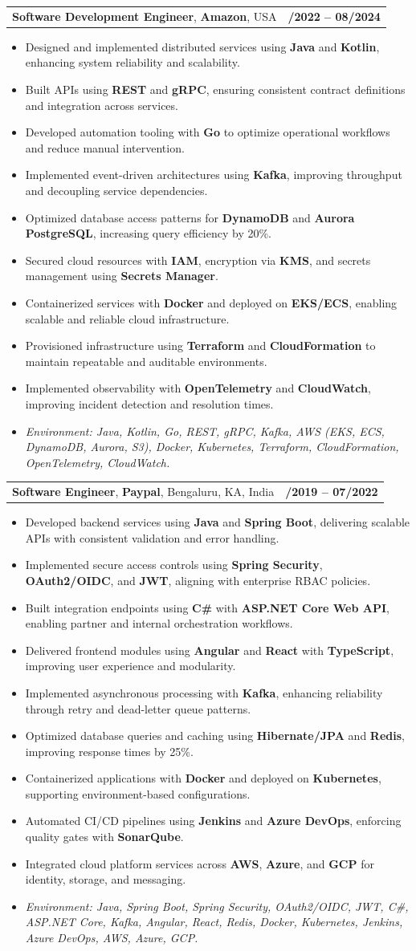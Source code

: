 \documentclass[letterpaper,11pt]{article}
\makeatletter
\newcommand{\resumeItem}[1]{
  \item\footnotesize{
    {#1 \vspace{-2pt}}
  }
}
\newcommand{\resumeSubheading}[4]{
  \vspace{-2pt}\item
    \begin{tabular*}{1.0\textwidth}[t]{l@{\extracolsep{\fill}}r}
      \textbf{\fontsize{10pt}{14pt}\selectfont #3}, \textbf{\fontsize{10pt}{14pt}\selectfont #1}, \fontsize{10pt}{14pt}\selectfont #4 & \textbf{\fontsize{10pt}{14pt}\selectfont #2} \\
    \end{tabular*}\vspace{-7pt}
}
\newcommand{\resumeItemListStart}{\begin{itemize}[leftmargin=*]}
\newcommand{\resumeItemListEnd}{\end{itemize}\vspace{-5pt}}
\makeatother
\begin{document}
\resumeSubheading
{Amazon}{10/2022 -- 08/2024}
{Software Development Engineer}{USA}
\resumeItemListStart
  \resumeItem{Designed and implemented distributed services using \textbf{Java} and \textbf{Kotlin}, enhancing system reliability and scalability.}
  \resumeItem{Built APIs using \textbf{REST} and \textbf{gRPC}, ensuring consistent contract definitions and integration across services.}
  \resumeItem{Developed automation tooling with \textbf{Go} to optimize operational workflows and reduce manual intervention.}
  \resumeItem{Implemented event-driven architectures using \textbf{Kafka}, improving throughput and decoupling service dependencies.}
  \resumeItem{Optimized database access patterns for \textbf{DynamoDB} and \textbf{Aurora PostgreSQL}, increasing query efficiency by 20\%.}
  \resumeItem{Secured cloud resources with \textbf{IAM}, encryption via \textbf{KMS}, and secrets management using \textbf{Secrets Manager}.}
  \resumeItem{Containerized services with \textbf{Docker} and deployed on \textbf{EKS/ECS}, enabling scalable and reliable cloud infrastructure.}
  \resumeItem{Provisioned infrastructure using \textbf{Terraform} and \textbf{CloudFormation} to maintain repeatable and auditable environments.}
  \resumeItem{Implemented observability with \textbf{OpenTelemetry} and \textbf{CloudWatch}, improving incident detection and resolution times.}
  \resumeItem{\textit{Environment: Java, Kotlin, Go, REST, gRPC, Kafka, AWS (EKS, ECS, DynamoDB, Aurora, S3), Docker, Kubernetes, Terraform, CloudFormation, OpenTelemetry, CloudWatch.}}
\resumeItemListEnd

\resumeSubheading
{Paypal}{08/2019 -- 07/2022}
{Software Engineer}{Bengaluru, KA, India}
\resumeItemListStart
  \resumeItem{Developed backend services using \textbf{Java} and \textbf{Spring Boot}, delivering scalable APIs with consistent validation and error handling.}
  \resumeItem{Implemented secure access controls using \textbf{Spring Security}, \textbf{OAuth2/OIDC}, and \textbf{JWT}, aligning with enterprise RBAC policies.}
  \resumeItem{Built integration endpoints using \textbf{C\#} with \textbf{ASP.NET Core Web API}, enabling partner and internal orchestration workflows.}
  \resumeItem{Delivered frontend modules using \textbf{Angular} and \textbf{React} with \textbf{TypeScript}, improving user experience and modularity.}
  \resumeItem{Implemented asynchronous processing with \textbf{Kafka}, enhancing reliability through retry and dead-letter queue patterns.}
  \resumeItem{Optimized database queries and caching using \textbf{Hibernate/JPA} and \textbf{Redis}, improving response times by 25\%.}
  \resumeItem{Containerized applications with \textbf{Docker} and deployed on \textbf{Kubernetes}, supporting environment-based configurations.}
  \resumeItem{Automated CI/CD pipelines using \textbf{Jenkins} and \textbf{Azure DevOps}, enforcing quality gates with \textbf{SonarQube}.}
  \resumeItem{Integrated cloud platform services across \textbf{AWS}, \textbf{Azure}, and \textbf{GCP} for identity, storage, and messaging.}
  \resumeItem{\textit{Environment: Java, Spring Boot, Spring Security, OAuth2/OIDC, JWT, C\#, ASP.NET Core, Kafka, Angular, React, Redis, Docker, Kubernetes, Jenkins, Azure DevOps, AWS, Azure, GCP.}}
\resumeItemListEnd
\end{document}
